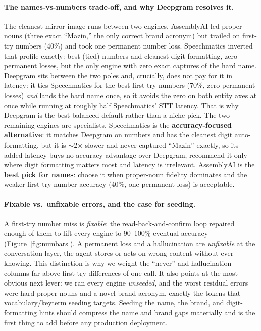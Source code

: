 \documentclass[11pt]{article}
\begin{document}
\paragraph{The names-vs-numbers trade-off, and why Deepgram resolves it.}
The cleanest mirror image runs between two engines. AssemblyAI led proper nouns
(three exact ``Mazin,'' the only correct brand acronym) but trailed on first-try
numbers (40\%) and took one permanent number loss. Speechmatics inverted that
profile exactly: best (tied) numbers and cleanest digit formatting, zero
permanent losses, but the only engine with zero exact captures of the hard name.
Deepgram sits between the two poles and, crucially, does not pay for it in
latency: it ties Speechmatics for the best first-try numbers (70\%, zero
permanent losses) \emph{and} lands the hard name once, so it avoids the zero on
both entity axes at once while running at roughly half Speechmatics' STT latency.
That is why Deepgram is the best-balanced default rather than a niche pick. The
two remaining engines are specialists. Speechmatics is the
\textbf{accuracy-focused alternative}: it matches Deepgram on numbers and has the
cleanest digit auto-formatting, but it is $\sim$2$\times$ slower and never
captured ``Mazin'' exactly, so its added latency buys no accuracy advantage over
Deepgram, recommend it only where digit formatting matters most and latency is
irrelevant. AssemblyAI is the \textbf{best pick for names}: choose it when
proper-noun fidelity dominates and the weaker first-try number accuracy (40\%,
one permanent loss) is acceptable.

\paragraph{Fixable vs.\ unfixable errors, and the case for seeding.}
A first-try number miss is \emph{fixable}: the read-back-and-confirm loop
repaired enough of them to lift every engine to 90--100\% eventual accuracy
(Figure~\ref{fig:numbars}). A permanent loss and a hallucination are
\emph{unfixable} at the conversation layer, the agent stores or acts on wrong
content without ever knowing. This distinction is why we weight the ``never''
and hallucination columns far above first-try differences of one call. It also
points at the most obvious next lever: we ran every engine \emph{unseeded}, and
the worst residual errors were hard proper nouns and a novel brand acronym,
exactly the tokens that vocabulary/keyterm seeding targets. Seeding the name,
the brand, and digit-formatting hints should compress the name and brand gaps
materially and is the first thing to add before any production deployment.
\end{document}
